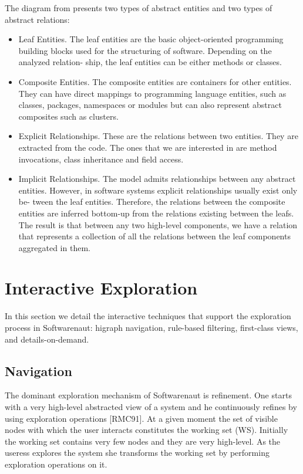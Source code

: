 \documentclass[preprint,12pt]{elsarticle}
\begin{document}
The diagram from  presents two types of abstract entities and two types of abstract relations:
\begin{itemize}
\item Leaf Entities. The leaf entities are the basic object-oriented programming building blocks used for the structuring of software. Depending on the analyzed relation- ship, the leaf entities can be either methods or classes.
\item Composite Entities. The composite entities are containers for other entities. They can have direct mappings to programming language entities, such as classes, packages, namespaces or modules but can also represent abstract composites such as clusters.
\item Explicit Relationships. These are the relations between two entities. They are extracted from the code. The ones that we are interested in are method invocations, class inheritance and field access.
\item Implicit Relationships. The model admits relationships between any abstract entities. However, in software systems explicit relationships usually exist only be- tween the leaf entities. Therefore, the relations between the composite entities are inferred bottom-up from the relations existing between the leafs. The result is that between any two high-level components, we have a relation that represents a collection of all the relations between the leaf components aggregated in them.
\end{itemize}




\section {Interactive Exploration}
\label {sec:interact}

In this section we detail the interactive techniques that support the exploration process in Softwarenaut: higraph navigation, rule-based filtering, first-class views, and details-on-demand.  

\subsection{Navigation}
The dominant exploration mechanism of Softwarenaut is refinement. One starts with a very high-level abstracted view of a system and he continuously refines by using exploration operations [RMC91]. At a given moment the set of visible nodes with which the user interacts constitutes the working set (WS). Initially the working set contains very few nodes and they are very high-level. As the useress explores the system she transforms the working set by performing exploration operations on it. 
\end{document}
